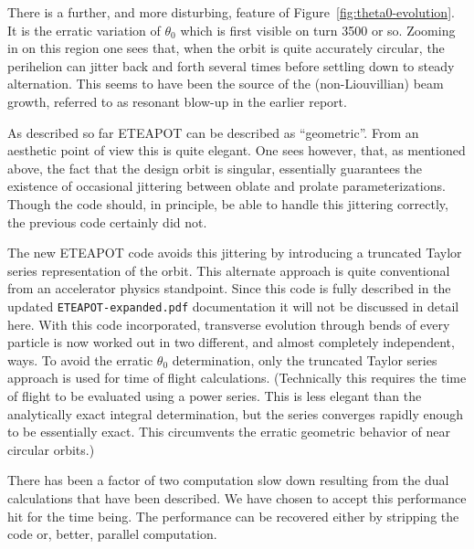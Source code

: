 \documentclass[]{article}
\begin{document}
There is a further, and more disturbing, feature of Figure~\ref{fig:theta0-evolution}.
It is the erratic variation of $\theta_0$ which is first visible on turn 
3500 or so. Zooming in on this region one sees that, when the orbit
is quite accurately circular, the perihelion can jitter back and forth
several times before settling down to steady alternation.
This seems to have been the source of the (non-Liouvillian) beam growth,
referred to as resonant blow-up in the earlier report.

As described so far ETEAPOT can be described as ``geometric''. From
an aesthetic point of view this is quite elegant. One sees however, that,
as mentioned above, the fact that the design orbit is singular, essentially
guarantees the existence of occasional jittering between oblate and
prolate parameterizations. Though the code should, in principle, be able
to handle this jittering correctly, the previous code certainly did not. 

The new ETEAPOT code avoids this jittering by introducing a truncated
Taylor series representation of the orbit. This alternate approach is
quite conventional from an accelerator physics standpoint.
Since this code is fully described 
in the updated {\tt ETEAPOT-expanded.pdf} documentation it will not be 
discussed in detail here. With this code incorporated, transverse 
evolution through bends of every particle is now worked out in two different, 
and almost completely independent, ways.
To avoid the erratic $\theta_0$
determination, only the truncated Taylor series approach is used for time 
of flight calculations. (Technically this requires the time of flight to
be evaluated using a power series. This is less elegant 
than the analytically exact integral determination, but the series
converges rapidly enough to be essentially exact. This circumvents the 
erratic geometric behavior of near circular orbits.) 

There has been a factor of two computation slow down
resulting from the dual calculations that have been described. We have 
chosen to accept this performance hit
for the time being. The performance can be recovered either by stripping the
code or, better, parallel computation.
\end{document}
